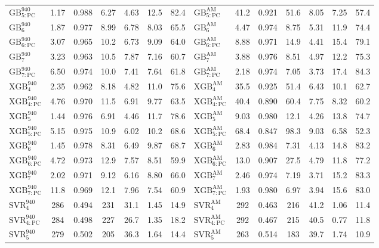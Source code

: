 \documentclass[a4paper,fleqn]{cas-sc}
\begin{document}
\begin{table}[<options>]
\begin{tabular*}{\tblwidth}{@{}LCCCCCCLCCCCCC@{}}
$\mathrm{GB}^{940}_{5:\mathrm{PC}}$&1.17&0.988&6.27&4.63&12.5&82.4&$\mathrm{GB}^\mathrm{AM}_{5:\mathrm{PC}}$&41.2&0.921&51.6&8.05&7.25&57.4\\
$\mathrm{GB}^{940}_{6}$&1.87&0.977&8.99&6.78&8.03&65.5&$\mathrm{GB}^\mathrm{AM}_{6}$&4.47&0.974&8.75&5.31&11.9&74.4\\
$\mathrm{GB}^{940}_{6:\mathrm{PC}}$&3.07&0.965&10.2&6.73&9.09&64.0&$\mathrm{GB}^\mathrm{AM}_{6:\mathrm{PC}}$&8.88&0.971&14.9&4.41&15.4&79.1\\
$\mathrm{GB}^{940}_{7}$&3.23&0.963&10.5&7.87&7.16&60.7&$\mathrm{GB}^\mathrm{AM}_{7}$&3.88&0.976&8.51&4.97&12.2&75.3\\
$\mathrm{GB}^{940}_{7:\mathrm{PC}}$&6.50&0.974&10.0&7.41&7.64&61.8&$\mathrm{GB}^\mathrm{AM}_{7:\mathrm{PC}}$&2.18&0.974&7.05&3.73&17.4&84.3\\
$\mathrm{XGB}^{940}_{4}$&2.35&0.962&8.18&4.82&11.0&75.6&$\mathrm{XGB}^\mathrm{AM}_{4}$&35.5&0.925&51.4&6.43&10.1&62.7\\
$\mathrm{XGB}^{940}_{4:\mathrm{PC}}$&4.76&0.970&11.5&6.91&9.77&63.5&$\mathrm{XGB}^\mathrm{AM}_{4:\mathrm{PC}}$&40.4&0.890&60.4&7.75&8.32&60.2\\
$\mathrm{XGB}^{940}_{5}$&1.44&0.976&6.91&4.46&11.7&78.6&$\mathrm{XGB}^\mathrm{AM}_{5}$&9.03&0.980&12.1&4.26&13.8&74.7\\
$\mathrm{XGB}^{940}_{5:\mathrm{PC}}$&5.15&0.975&10.9&6.02&10.2&68.6&$\mathrm{XGB}^\mathrm{AM}_{5:\mathrm{PC}}$&68.4&0.847&98.3&9.03&6.58&52.3\\
$\mathrm{XGB}^{940}_{6}$&1.45&0.978&8.31&6.49&9.87&68.7&$\mathrm{XGB}^\mathrm{AM}_{6}$&2.83&0.984&7.31&4.13&14.8&83.2\\
$\mathrm{XGB}^{940}_{6:\mathrm{PC}}$&4.72&0.973&12.9&7.57&8.51&59.9&$\mathrm{XGB}^\mathrm{AM}_{6:\mathrm{PC}}$&13.0&0.907&27.5&4.79&11.8&77.2\\
$\mathrm{XGB}^{940}_{7}$&2.02&0.971&9.12&6.16&8.80&66.0&$\mathrm{XGB}^\mathrm{AM}_{7}$&2.46&0.974&7.19&3.71&15.2&83.3\\
$\mathrm{XGB}^{940}_{7:\mathrm{PC}}$&11.8&0.969&12.1&7.96&7.54&60.9&$\mathrm{XGB}^\mathrm{AM}_{7:\mathrm{PC}}$&1.93&0.980&6.97&3.94&15.6&83.0\\
$\mathrm{SVR}^{940}_{4}$&286&0.494&231&31.1&1.45&14.9&$\mathrm{SVR}^\mathrm{AM}_{4}$&292&0.463&216&41.2&1.06&11.4\\
$\mathrm{SVR}^{940}_{4:\mathrm{PC}}$&284&0.498&227&26.7&1.35&18.2&$\mathrm{SVR}^\mathrm{AM}_{4:\mathrm{PC}}$&292&0.467&215&40.5&0.77&11.8\\
$\mathrm{SVR}^{940}_{5}$&279&0.502&205&36.3&1.64&14.4&$\mathrm{SVR}^\mathrm{AM}_{5}$&263&0.514&183&39.7&1.74&10.9\\

\end{tabular*}
\end{table}
\end{document}
